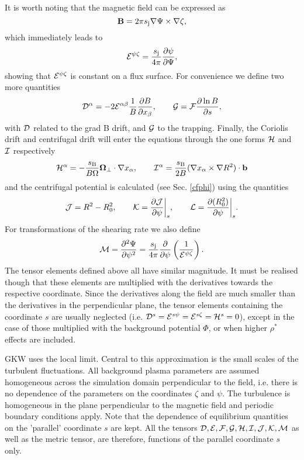 It is worth noting that the magnetic field can be expressed as 
\begin{equation}
\label{eq:efun-cst}
 \mathbf{B} = 2\pi s_{\rm j} \nabla \Psi \times \nabla \zeta,
\end{equation}
which immediately leads to 
\begin{equation} 
{\cal E}^{\psi \zeta} = \frac{s_{\rm j}}{4\pi}\frac{\partial \psi}{\partial \Psi},
\label{eq:efun-flux}
\end{equation} 
showing that ${\cal E}^{\psi \zeta}$ is constant on a flux surface. For convenience we define two more quantities 
\begin{equation} 
{\cal D}^\alpha = - 2 {\cal E}^{\alpha \beta} {1 \over B} \frac{\partial  B}{\partial x_\beta}, \qquad 
{\cal G} = {\cal F} \frac{\partial  \ln B}{\partial s} ,
\end{equation}
with ${\cal D}$ related to the grad B drift, and ${\cal G}$ to the trapping. Finally, the Coriolis drift and centrifugal drift will enter the 
equations through the one forms ${\cal H}$ and ${\cal I}$ respectively
\begin{equation} 
{\cal H}^\alpha = -\frac{s_{\rm B}}{B\Omega}{\bf \Omega}_\perp \cdot \nabla x_\alpha, 
\qquad 
{\cal I}^\alpha =  {s_{\rm B} \over 2 B} (\nabla x_\alpha \times \nabla R^2) \cdot {\bf b}
\end{equation}
and the centrifugal potential is calculated (see Sec. \ref{cfphi}) using the quantities
\begin{equation} 
{\cal J} = R^2 - R_0^2, 
\qquad 
{\cal K} = \frac{\partial  {\cal J}}{\partial \psi}\biggr|_s,
\qquad
{\cal L} = \frac{\partial  (R_0^2)}{\partial \psi}\biggr|_s.
\end{equation}
For transformations of the shearing rate we also define 
\begin{equation}
{\cal M} = \frac{\partial^2 \Psi}{\partial \psi^2} = {s_{\rm j} \over 4 \pi}\frac{\partial }{\partial \psi}\left({1 \over {\cal E}^{{\psi \zeta}}}\right).
\end{equation}
The tensor elements defined above all have similar magnitude. It must be realised though that these elements
are multiplied with the derivatives towards the respective coordinate. Since the derivatives along the field 
are much smaller than the derivatives in the perpendicular plane, the tensor elements containing the coordinate
$s$ are usually neglected (i.e. ${\cal D}^s = {\cal E}^{s \psi} = {\cal E}^{s \zeta} = {\cal H}^s = 0$), 
except in the case of those multiplied with the background potential $\Phi$, or when higher $\rho^*$ effects are included.

GKW uses the local limit. Central to this approximation is the small scales of the turbulent fluctuations. 
All background plasma parameters are assumed homogeneous across the simulation domain perpendicular to 
the field, i.e. there is no dependence of the parameters on the coordinates $\zeta$ and $\psi$.  The turbulence is homogeneous 
in the plane perpendicular to the magnetic field and periodic boundary conditions apply.  
Note that the dependence of equilibrium quantities on the 'parallel' coordinate $s$ are kept. 
All the tensors ${\cal D, E, F, G, H, I, J, K, M}$ as well as the metric tensor, are therefore, functions of the
parallel coordinate $s$ only.


